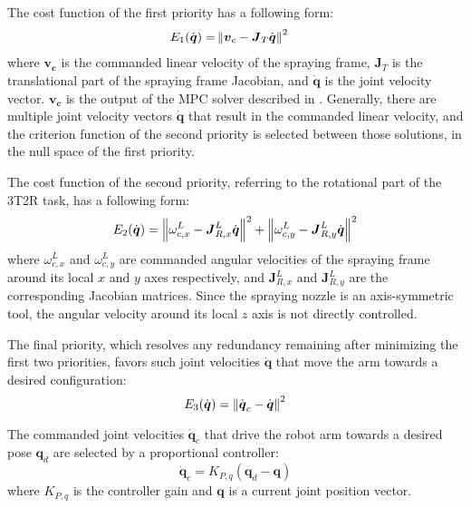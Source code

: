 The cost function of the first priority has a following form:
\begin{equation} \label{eq:priority_1}
	\begin{aligned}
E_1(\dot{\boldsymbol{q}}) = & \left\lVert  \boldsymbol{v}_c - \boldsymbol{J}_{T}\dot{\boldsymbol{q}}  \right\rVert^2
	\end{aligned}
\end{equation}
where $\boldsymbol{v_c}$ is the commanded linear velocity of the spraying frame, $\boldsymbol{J}_{T}$ is the translational part of the spraying frame Jacobian, and $\dot{\boldsymbol{q}}$ is the joint velocity vector.
$\boldsymbol{v_c}$ is the output of the MPC solver described in \cite{Vatavuk2022}. Generally, there are multiple joint velocity vectors $\dot{\boldsymbol{q}}$ that result in the commanded linear velocity, and the criterion function of the second priority is selected between those solutions, in the null space of the first priority.

The cost function of the second priority, referring to the rotational part of the 3T2R task, has a following form:
\begin{equation} \label{eq:priority_2}
E_2(\dot{\boldsymbol{q}}) = \left\lVert  \omega^L_{c,x} - \boldsymbol{J}^L_{R,x}\dot{\boldsymbol{q}}  \right\rVert^2 + \left\lVert  \omega^L_{c,y} - \boldsymbol{J}^L_{R,y}\dot{\boldsymbol{q}}  \right\rVert^2
\end{equation}
where $\omega^L_{c,x}$ and $\omega^L_{c,y}$ are commanded angular velocities of the spraying frame around its local $x$ and $y$ axes respectively, and $\boldsymbol{J}^L_{R,x}$ and $\boldsymbol{J}^L_{R,y}$ are the corresponding Jacobian matrices. Since the spraying nozzle is an axis-symmetric tool, the angular velocity around its local $z$ axis is not directly controlled.

The final priority, which resolves any redundancy remaining after minimizing the first two priorities, favors such joint velocities $\dot{\boldsymbol{q}}$ that move the arm towards a desired configuration:
\begin{equation} \label{eq:priority_3}
E_3(\dot{\boldsymbol{q}}) = \left\lVert  \dot{\boldsymbol{q}}_c - \dot{\boldsymbol{q}}  \right\rVert^2
\end{equation}

The commanded joint velocities $\dot{\boldsymbol{q}}_c$ that drive the robot arm towards a desired pose $\boldsymbol{q}_d$ are selected by a proportional controller:
\begin{equation}
\dot{\boldsymbol{q}}_{c} = K_{P,q}(\boldsymbol{q}_d - \boldsymbol{q})
\end{equation}
where $K_{P,q}$ is the controller gain and $\boldsymbol{q}$ is a current joint position vector.

